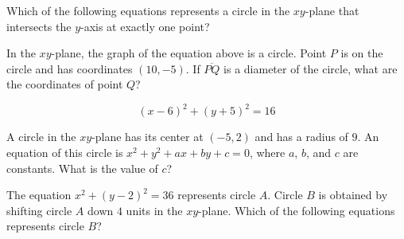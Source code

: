 \vspace{0.75em}


\vspace{2em}

\noindent\markforreview
\vspace{1em}

Which of the following equations represents a circle in the $xy$-plane that intersects the $y$-axis at exactly one point?

\vspace{0.75em}


\vspace{2em}
\newpage
\noindent\markforreview
\vspace{1em}

In the $xy$-plane, the graph of the equation above is a circle. Point $P$ is on the circle and has coordinates $(10, -5)$. If $\overline{PQ}$ is a diameter of the circle, what are the coordinates of point $Q$?

\[
(x - 6)^2 + (y + 5)^2 = 16
\]

\vspace{0.75em}


\vspace{2em}

\noindent\markforreview
\vspace{1em}

A circle in the $xy$-plane has its center at $(-5, 2)$ and has a radius of $9$. An equation of this circle is $x^2 + y^2 + ax + by + c = 0$, where $a$, $b$, and $c$ are constants. What is the value of $c$?

\vspace{2em}

\noindent\markforreview
\vspace{1em}

The equation $x^2 + (y - 2)^2 = 36$ represents circle $A$. Circle $B$ is obtained by shifting circle $A$ down $4$ units in the $xy$-plane. Which of the following equations represents circle $B$?

\vspace{0.75em}

